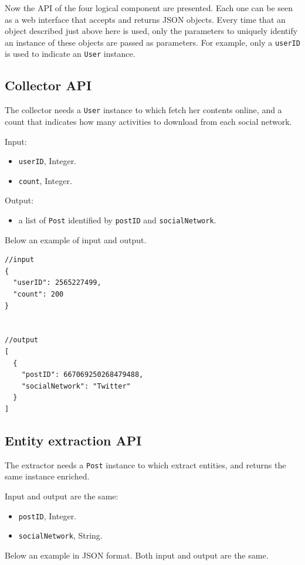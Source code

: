 Now the API of the four logical component are presented. Each one can be seen as a web interface that accepts and returns JSON objects. Every time that an object described just above here is used, only the parameters to uniquely identify an instance of these objects are passed as parameters. For example, only a \texttt{userID} is used to indicate an \texttt{User} instance.

\subsection{Collector API}
The collector needs a \texttt{User} instance to which fetch her contents online, and a count that indicates how many activities to download from each social network.

Input:
\begin{itemize}
\item \texttt{userID}, Integer.
\item \texttt{count}, Integer.
\end{itemize}

Output:
\begin{itemize}
\item a list of \texttt{Post} identified by \texttt{postID} and \texttt{socialNetwork}.
\end{itemize}

Below an example of input and output.
\begin{multicols}{2}
\begin{Verbatim}
//input
{
  "userID": 2565227499,
  "count": 200
}


//output
[
  {
    "postID": 667069250268479488,
    "socialNetwork": "Twitter"
  }
]
\end{Verbatim}
\end{multicols}

\subsection{Entity extraction API}
The extractor needs a \texttt{Post} instance to which extract entities, and returns the same instance enriched.

Input and output are the same:
\begin{itemize}
\item \texttt{postID}, Integer.
\item \texttt{socialNetwork}, String.
\end{itemize}

Below an example in JSON format. Both input and output are the same.

